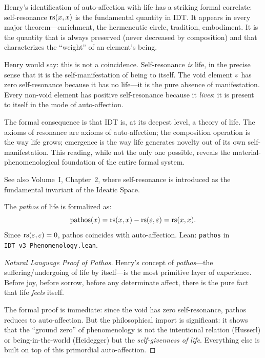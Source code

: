 \begin{interpretation}
\label{interp:henry-life}
Henry's identification of auto-affection with life has a striking formal
correlate: self-resonance $\mathrm{rs}(x, x)$ is the fundamental quantity in IDT.
It appears in every major theorem---enrichment, the hermeneutic circle,
tradition, embodiment.  It is the quantity that is always preserved (never
decreased by composition) and that characterizes the ``weight'' of an
element's being.

Henry would say: this is not a coincidence.  Self-resonance \emph{is}
life, in the precise sense that it is the self-manifestation of being to
itself.  The void element $\varepsilon$ has zero self-resonance because it has
no life---it is the pure absence of manifestation.  Every non-void element
has positive self-resonance because it \emph{lives}: it is present to
itself in the mode of auto-affection.

The formal consequence is that IDT is, at its deepest level, a theory of
life.  The axioms of resonance are axioms of auto-affection; the composition
operation is the way life grows; emergence is the way life generates novelty
out of its own self-manifestation.  This reading, while not the only one
possible, reveals the material-phenomenological foundation of the entire
formal system.

See also Volume~I, Chapter~2, where self-resonance is introduced as the
fundamental invariant of the Ideatic Space.
\end{interpretation}

\begin{theorem}
\label{thm:pathos}
The \textit{pathos} of life is formalized as:
\[
\mathrm{pathos}(x) = \mathrm{rs}(x, x) - \mathrm{rs}(\varepsilon, \varepsilon) = \mathrm{rs}(x, x).
\]
Since $\mathrm{rs}(\varepsilon, \varepsilon) = 0$, pathos coincides with auto-affection.
Lean: \texttt{pathos} in \texttt{IDT\_v3\_Phenomenology.lean}.
\end{theorem}

\begin{proof}[Natural Language Proof of Pathos]
Henry's concept of \textit{pathos}---the suffering/undergoing of life by
itself---is the most primitive layer of experience.  Before joy, before
sorrow, before any determinate affect, there is the pure fact that life
\emph{feels} itself.

The formal proof is immediate: since the void has zero self-resonance,
pathos reduces to auto-affection.  But the philosophical import is
significant: it shows that the ``ground zero'' of phenomenology is not
the intentional relation (Husserl) or being-in-the-world (Heidegger)
but the \emph{self-givenness of life}.  Everything else is built on top
of this primordial auto-affection.
\end{proof}

